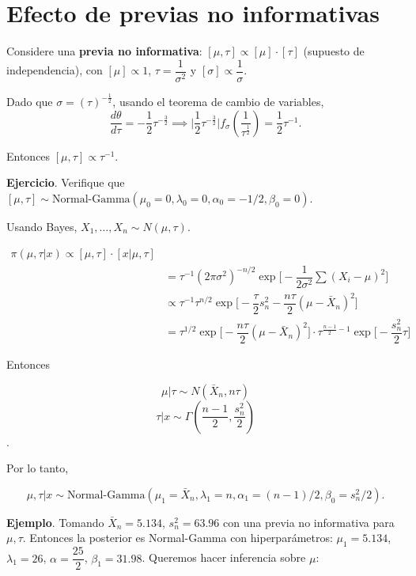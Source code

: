 \documentclass[
  12pt,
]{book}
\begin{document}
\hypertarget{efecto-de-previas-no-informativas}{%
\section{Efecto de previas no informativas}\label{efecto-de-previas-no-informativas}}

Considere una \textbf{previa no informativa}: \([\mu,\tau] \propto [\mu]\cdot[\tau]\) (supuesto de independencia), con \([\mu] \propto 1\), \(\tau = \dfrac1{\sigma^2}\) y \([\sigma] \propto \dfrac{1}{\sigma}\).

Dado que \(\sigma = (\tau)^{-\frac{1}2}\), usando el teorema de cambio de variables,
\[\dfrac{d\theta}{d\tau} = -\dfrac12\tau^{-\frac32} \implies \bigg|\dfrac12\tau^{-\frac32}\bigg|f_\sigma\left(\dfrac 1{\tau^{\frac12}}\right) = \dfrac 12 \tau^{-1}.\]

Entonces \([\mu,\tau]\propto\tau^{-1}\).

\textbf{Ejercicio}. Verifique que \([\mu,\tau]\sim \text{Normal-Gamma}(\mu_0=0,\lambda_0=0,\alpha_0=-1/2,\beta_0=0)\).

Usando Bayes, \(X_1,\dots,X_n \sim N(\mu, \tau)\).

\begin{align*}
 \pi(\mu,\tau|x) \propto [\mu,\tau]\cdot[x|\mu, \tau] \\ & = \tau^{-1} (2\pi\sigma^2)^{-n/2}\exp\bigg[-\dfrac 1{2\sigma^2}\sum (X_i-\mu)^2\bigg]\\
 & \propto \tau^{-1} \tau^{n/2} \exp\bigg[-\dfrac \tau 2 s_n^2 - \dfrac{n\tau}{2}(\mu-\bar X_n)^2\bigg]\\
 & = \tau^{1/2} \exp\bigg[-\dfrac{n\tau}2 (\mu-\bar X_n)^2\bigg]\cdot \tau^{\frac{n-1}{2}-1}\exp\bigg[-\dfrac{s_n^2}{2}\tau \bigg]
 \end{align*}

Entonces

\[\mu|\tau \sim N(\bar X_n,n\tau)\]
\[\tau|x\sim \Gamma\left(\dfrac{n-1}2, \dfrac{s_n^2}{2}\right)\].

Por lo tanto,

\[\mu,\tau|x \sim \text{Normal-Gamma}(\mu_1 = \bar X_n,\lambda_1=n,\alpha_1=(n-1)/2,\beta_0=s_n^2/2).\]

\textbf{Ejemplo}. Tomando \(\bar X_n = 5.134\), \(s_n^2 = 63.96\) con una previa no informativa para \(\mu,\tau\). Entonces la posterior es Normal-Gamma con hiperparámetros: \(\mu_1 = 5.134\), \(\lambda_1 = 26\), \(\alpha = \dfrac{25}2\), \(\beta_1 = 31.98\). Queremos hacer inferencia sobre \(\mu\):
\end{document}

